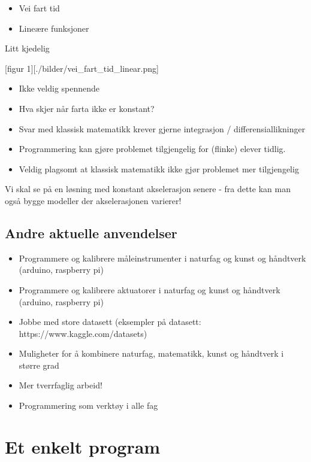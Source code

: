 \documentclass[11pt]{article}
\providecommand{\tightlist}{%
      \setlength{\itemsep}{0pt}\setlength{\parskip}{0pt}}
\begin{document}
\begin{itemize}
\tightlist
\item
  Vei fart tid
\item
  Lineære funksjoner
\end{itemize}

Litt kjedelig

    

    {[}figur 1{]}{[}./bilder/vei\_fart\_tid\_linear.png{]}

    \begin{itemize}
\item
  Ikke veldig spennende
\item
  Hva skjer når farta ikke er konstant?
\item
  Svar med klassisk matematikk krever gjerne integrasjon /
  differensiallikninger
\item
  Programmering kan gjøre problemet tilgjengelig for (flinke) elever
  tidlig.
\item
  Veldig plagsomt at klassisk matematikk ikke gjør problemet mer
  tilgjengelig
\end{itemize}

    Vi skal se på en løsning med konstant akselerasjon senere - fra dette
kan man også bygge modeller der akselerasjonen varierer!

    \hypertarget{andre-aktuelle-anvendelser}{%
\subsection{Andre aktuelle
anvendelser}\label{andre-aktuelle-anvendelser}}

\begin{itemize}
\tightlist
\item
  Programmere og kalibrere måleinstrumenter i naturfag og kunst og
  håndtverk (arduino, raspberry pi)
\item
  Programmere og kalibrere aktuatorer i naturfag og kunst og håndtverk
  (arduino, raspberry pi)
\item
  Jobbe med store datasett (eksempler på datasett:
  https://www.kaggle.com/datasets)
\item
  Muligheter for å kombinere naturfag, matematikk, kunst og håndtverk i
  større grad
\item
  Mer tverrfaglig arbeid!
\item
  Programmering som verktøy i alle fag
\end{itemize}

    \hypertarget{et-enkelt-program}{%
\section{Et enkelt program}\label{et-enkelt-program}}
\end{document}
